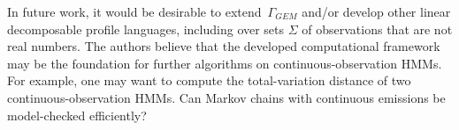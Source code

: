 \documentclass[a4paper,UKenglish,cleveref, autoref,mathscr, amsthm, thmtools, thm-restate]{lipics-v2019}
\newcommand{\1}{\mathbb{I}}
\newcommand{\pl}{\Gamma_{\mathit{GEM}}}
\begin{document}
In future work, it would be desirable to extend~$\pl$ and/or develop other linear decomposable profile languages, including over sets $\Sigma$ of observations that are not real numbers.
The authors believe that the developed computational framework may be the foundation for further algorithms on continuous-observation HMMs.
For example, one may want to compute the total-variation distance of two continuous-observation HMMs.
Can Markov chains with continuous emissions be model-checked efficiently?


\end{document}
